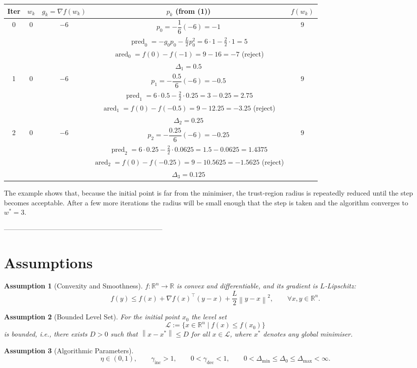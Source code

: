 \documentclass{article}
\newtheorem{assumption}{Assumption}
\newcommand{\norm}[1]{\left\lVert#1\right\rVert}
\newcommand{\R}{\mathbb{R}}
\begin{document}
\begin{center}
\begin{tabular}{c|c|c|c|c}
\textbf{Iter} & $w_{k}$ & $g_{k}= \nabla f(w_{k})$ & $p_{k}$ (from (1)) & $f(w_{k})$\\\hline
0 & $0$ & $-6$ & $p_{0}= -\dfrac{1}{6}(-6)= -1$ & $9$\\
  & & & $\operatorname{pred}_{0}= -g_{0}p_{0}-\frac{L}{2}p_{0}^{2}=6\cdot1-\frac{2}{2}\cdot1=5$ & \\
  & & & $\operatorname{ared}_{0}=f(0)-f(-1)=9-16= -7$ (reject) & \\
  & & & $\Delta_{1}=0.5$ & \\
\hline
1 & $0$ & $-6$ & $p_{1}= -\dfrac{0.5}{6}(-6)= -0.5$ & $9$\\
  & & & $\operatorname{pred}_{1}=6\cdot0.5-\frac{2}{2}\cdot0.25=3-0.25=2.75$ & \\
  & & & $\operatorname{ared}_{1}=f(0)-f(-0.5)=9-12.25=-3.25$ (reject) & \\
  & & & $\Delta_{2}=0.25$ & \\
\hline
2 & $0$ & $-6$ & $p_{2}= -\dfrac{0.25}{6}(-6)= -0.25$ & $9$\\
  & & & $\operatorname{pred}_{2}=6\cdot0.25-\frac{2}{2}\cdot0.0625=1.5-0.0625=1.4375$ & \\
  & & & $\operatorname{ared}_{2}=f(0)-f(-0.25)=9-10.5625=-1.5625$ (reject) & \\
  & & & $\Delta_{3}=0.125$ & \\
\end{tabular}
\end{center}
The example shows that, because the initial point is far from the minimiser, the trust‑region radius is repeatedly reduced until the step becomes acceptable. After a few more iterations the radius will be small enough that the step is taken and the algorithm converges to $w^{*}=3$.

---------------------------------------------------------------------

\section*{Assumptions}
\begin{assumption}[Convexity and Smoothness]\label{as:convex}
$f:\R^{n}\rightarrow\R$ is convex and differentiable, and its gradient is $L$‑Lipschitz:
\[
f(y)\le f(x)+\nabla f(x)^{\top}(y-x)+\frac{L}{2}\norm{y-x}^{2},\qquad\forall x,y\in\R^{n}. \tag{A1}
\]
\end{assumption}
\begin{assumption}[Bounded Level Set]\label{as:bounded}
For the initial point $x_{0}$ the level set 
\[
\mathcal{L}:=\{x\in\R^{n}\mid f(x)\le f(x_{0})\}
\]
is bounded, i.e., there exists $D>0$ such that $\norm{x-x^{*}}\le D$ for all $x\in\mathcal{L}$, where $x^{*}$ denotes any global minimiser.
\end{assumption}
\begin{assumption}[Algorithmic Parameters]\label{as:param}
\[
\eta\in(0,1),\qquad
\gamma_{\text{inc}}>1,\qquad
0<\gamma_{\text{dec}}<1,\qquad
0<\Delta_{\min}\le\Delta_{0}\le\Delta_{\max}<\infty .
\]
\end{assumption}
\end{document}
